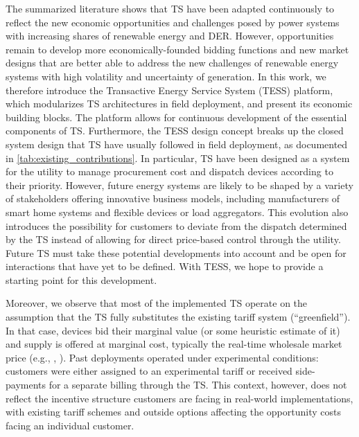 \documentclass[12pt]{article}{Definitions/mdpi}
\begin{document}
The summarized literature shows that TS have been adapted continuously to reflect the new economic opportunities and challenges posed by power systems with increasing shares of renewable energy and DER.
However, opportunities remain to develop more economically-founded bidding functions and new market designs that are better able to address the new challenges of renewable energy systems with high volatility and uncertainty of generation.
In this work, we therefore introduce the Transactive Energy Service System (TESS) platform, which modularizes TS architectures in field deployment, and present its economic building blocks. 
The platform allows for continuous development of the essential components of TS.
Furthermore, the TESS design concept breaks up the closed system design that TS have usually followed in field deployment, as documented in \cref{tab:existing_contributions}. In particular, TS have been designed as a system for the utility to manage procurement cost and dispatch devices according to their priority. However, future energy systems are likely to be shaped by a variety of stakeholders offering innovative business models, including manufacturers of smart home systems and flexible devices or load aggregators. This evolution also introduces the possibility for customers to deviate from the dispatch determined by the TS instead of allowing for direct price-based control through the utility. 
Future TS must take these potential developments into account and be open for interactions that have yet to be defined. With TESS, we hope to provide a starting point for this development.

Moreover, we observe that most of the implemented TS operate on the assumption that the TS fully substitutes the existing tariff system (``greenfield''). 
In that case, devices bid their marginal value (or some heuristic estimate of it) and supply is offered at marginal cost, typically the real-time wholesale market price (e.g., \citet{PNNL2006}, \citet{katipamula_transactive_2017}). Past deployments operated under experimental conditions: customers were either assigned to an experimental tariff or received side-payments for a separate billing through the TS. This context, however, does not reflect the incentive structure customers are facing in real-world implementations, with existing tariff schemes and outside options affecting the opportunity costs facing an individual customer. 
\end{document}
